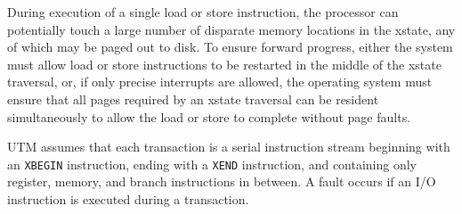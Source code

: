 During execution of a single load or store instruction, the processor can
potentially touch a large number of disparate memory locations in the
xstate, any of which may be paged out to disk.  To ensure forward
progress, either the system must allow load or store instructions to
be restarted in the middle of the xstate traversal, or, if only
precise interrupts are allowed, the operating system must ensure that
all pages required by an xstate traversal can be resident
simultaneously to allow the load or store to complete without page
faults.

UTM assumes that each transaction is a serial instruction stream
beginning with an \texttt{XBEGIN} instruction, ending with a
\texttt{XEND} instruction, and containing only register, memory, and
branch instructions in between.  A fault occurs if an I/O instruction
is executed during a transaction.





